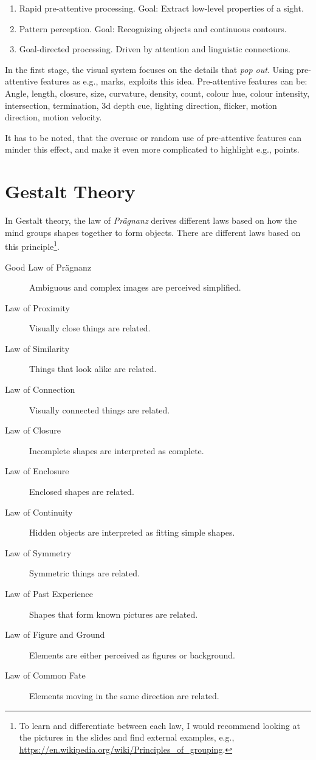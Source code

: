 \begin{enumerate}
    \item Rapid pre-attentive processing.
        Goal: Extract low-level properties of a sight.
    \item Pattern perception.
        Goal: Recognizing objects and continuous contours.
    \item Goal-directed processing.
        Driven by attention and linguistic connections.
\end{enumerate}

\noindent
In the first stage, the visual system focuses on the details that \emph{pop out}.
Using pre-attentive features as e.g., marks, exploits this idea.
Pre-attentive features can be: Angle, length, closure, size, curvature, density, count, colour hue, colour intensity, intersection, termination, 3d depth cue, lighting direction, flicker, motion direction, motion velocity.

It has to be noted, that the overuse or random use of pre-attentive features can minder this effect, and make it even more complicated to highlight e.g., points.

\begin{center}
\end{center}

\section{Gestalt Theory}
In Gestalt theory, the law of \emph{Prägnanz} derives different laws based on how the mind groups shapes together to form objects.
There are different laws based on this principle\footnote{To learn and differentiate between each law, I would recommend looking at the pictures in the slides and find external examples, e.g., \url{https://en.wikipedia.org/wiki/Principles_of_grouping}.}.

\begin{description}
    \item[Good Law of Prägnanz] Ambiguous and complex images are perceived simplified.
    \item[Law of Proximity] Visually close things are related.
    \item[Law of Similarity] Things that look alike are related.
    \item[Law of Connection] Visually connected things are related.
    \item[Law of Closure] Incomplete shapes are interpreted as complete.
    \item[Law of Enclosure] Enclosed shapes are related.
    \item[Law of Continuity] Hidden objects are interpreted as fitting simple shapes.
    \item[Law of Symmetry] Symmetric things are related.
    \item[Law of Past Experience] Shapes that form known pictures are related.
    \item[Law of Figure and Ground] Elements are either perceived as figures or background.
    \item[Law of Common Fate] Elements moving in the same direction are related.
\end{description}

